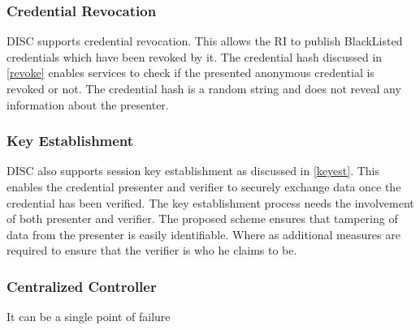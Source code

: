 \documentclass[journal]{IEEEtran}
\begin{document}
\subsubsection{Credential Revocation}
DISC supports credential revocation. This allows the RI to publish BlackListed credentials which have been revoked by it. The credential hash discussed in \ref{revoke} enables services to check if the presented anonymous credential is revoked or not. The credential hash is a random string and does not reveal any information about the presenter.

\subsubsection{Key Establishment}
DISC also supports session key establishment as discussed in \ref{keyest}. This enables the credential presenter and verifier to securely exchange data once the credential has been verified. The key establishment process needs the involvement of both presenter and verifier. The proposed scheme ensures that tampering of data from the presenter is easily identifiable. Where as additional measures are required to ensure that the verifier is who he claims to be.


\subsubsection{Centralized Controller}
It can be a single point of failure
\end{document}
